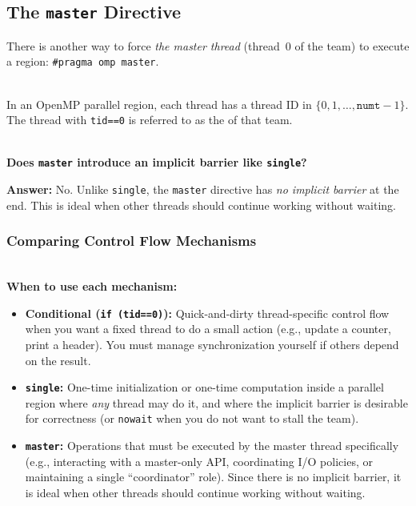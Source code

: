 \subsection{The \texttt{master} Directive}
\label{sec:master-directive}

There is another way to force \emph{the master thread} (thread~0 of the team) to execute a region: \texttt{\#pragma omp master}.

\begin{ppdefn}
\\In an OpenMP parallel region, each thread has a thread ID in $\{0, 1, \dots, \texttt{numt}-1\}$. The thread with \texttt{tid==0} is referred to as the  of that team.
\end{ppdefn}


\begin{ppquestion}
\textbf{\\Does \texttt{master} introduce an implicit barrier like \texttt{single}?}

\textbf{Answer:} No. Unlike \texttt{single}, the \texttt{master} directive has \emph{no implicit barrier} at the end.
This is ideal when other threads should continue working without waiting.
\end{ppquestion}

\subsubsection{Comparing Control Flow Mechanisms}

\begin{ppnote}
\textbf{\\When to use each mechanism:}
\begin{itemize}
    \item \textbf{Conditional (\texttt{if (tid==0)}):} Quick-and-dirty thread-specific control flow when you want a fixed thread to do a small action (e.g., update a counter, print a header). You must manage synchronization yourself if others depend on the result.
    \item \textbf{\texttt{single}:} One-time initialization or one-time computation inside a parallel region where \emph{any} thread may do it, and where the implicit barrier is desirable for correctness (or \texttt{nowait} when you do not want to stall the team).
    \item \textbf{\texttt{master}:} Operations that must be executed by the master thread specifically (e.g., interacting with a master-only API, coordinating I/O policies, or maintaining a single ``coordinator'' role). Since there is no implicit barrier, it is ideal when other threads should continue working without waiting.
\end{itemize}
\end{ppnote}

